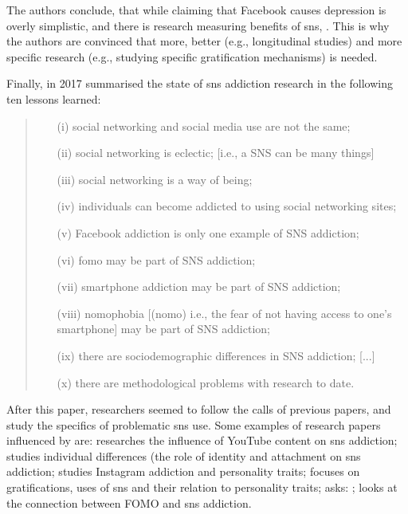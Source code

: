 The authors conclude, that while claiming that Facebook causes depression is overly simplistic, and there is research measuring benefits of \gls{sns},  \citep{baker_relationship_2016}.
This is why the authors are convinced that more, better (e.g., longitudinal studies) and more specific research (e.g., studying specific gratification mechanisms) is needed. 

Finally, in 2017 \citet{kuss_social_2017} summarised the state of \gls{sns} addiction research in the following ten lessons learned:
\begin{quote}
\begin{itemize}
    \item[(i)] social networking and social media use are not the same;
    \item[(ii)] social networking is eclectic; [i.e., a SNS can be many things]
    \item[(iii)] social networking is a way of being; 
    \item[(iv)] individuals can become addicted to using social networking sites;
    \item[(v)] Facebook addiction is only one example of SNS addiction;
    \item[(vi)] \gls{fomo} may be part of SNS addiction; 
    \item[(vii)] smartphone addiction may be part of SNS addiction; 
    \item[(viii)] nomophobia  [(\acrlong{nomo}) i.e., the fear of not having access to one's smartphone] may be part of SNS addiction;
    \item[(ix)] there are sociodemographic differences in SNS addiction; [...]
    \item[(x)] there are methodological problems with research to date.
\end{itemize}
\end{quote}
\citep[formatting added]{kuss_social_2017}

After this paper, researchers seemed to follow the calls of previous papers, and study the specifics of problematic \gls{sns} use. 
Some examples of research papers influenced by \citep{kuss_social_2017} are:
\citep{balakrishnan_social_2017} researches the influence of YouTube content on \gls{sns} addiction;
\citep{monacis_exploring_2017} studies individual differences (the role of identity and attachment on \gls{sns} addiction;
\citep{kircaburun_instagram_2018} studies Instagram addiction and personality traits; 
\citep{kircaburun_uses_2020} focuses on gratifications, uses of \gls{sns} and their relation to personality traits; 
\citep{balcerowska_is_2020} asks: ;
\citep{fabris_investigating_2020} looks at the connection between FOMO and \gls{sns} addiction.

